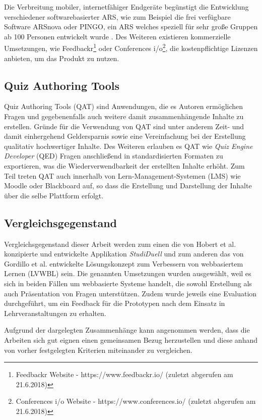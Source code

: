 \documentclass[conference]{IEEEtran}
\begin{document}
Die Verbreitung mobiler, internetfähiger Endgeräte begünstigt die Entwicklung verschiedener softwarebasierter ARS, wie zum Beispiel die frei verfügbare Software ARSnova \cite{Quibeldey-Cirkel2013} oder PINGO, ein ARS welches speziell für sehr große Gruppen ab 100 Personen entwickelt wurde \cite{Reinhardt2012}. Des Weiteren existieren kommerzielle Umsetzungen, wie Feedbackr\footnote[3]{Feedbackr Website - https://www.feedbackr.io/ (zuletzt abgerufen am 21.6.2018)} oder Conferences i/o\footnote[4]{Conferences i/o Website - https://www.conferences.io/ (zuletzt abgerufen am 21.6.2018)}, die kostenpflichtige Lizenzen anbieten, um das Produkt zu nutzen.

\subsection{Quiz Authoring Tools}
Quiz Authoring Tools (QAT) sind Anwendungen, die es Autoren ermöglichen Fragen und gegebenenfalls auch weitere damit zusammenhängende Inhalte zu erstellen. Gründe für die Verwendung von QAT sind unter anderem Zeit- und damit einhergehend Geldersparnis sowie eine Vereinfachung bei der Erstellung qualitativ hochwertiger Inhalte. Des Weiteren erlauben es QAT wie \emph{Quiz Engine Developer} (QED) Fragen anschließend in standardisierten Formaten zu exportieren, was die Wiederverwendbarkeit der erstellten Inhalte erhöht. Zum Teil treten QAT auch innerhalb von Lern-Management-Systemen (LMS) wie Moodle oder Blackboard auf, so dass die Erstellung und Darstellung der Inhalte über die selbe Plattform erfolgt. \cite[S. 2]{Gordillo2015} 

\subsection{Vergleichsgegenstand}
Vergleichsgegenstand dieser Arbeit werden zum einen die von Hobert et al. konzipierte und entwickelte Applikation \emph{StudiDuell}\cite{Hobert2017} und zum anderen das von Gordillo et al. entwickelte Lösungskonzept zum Verbessern von webbasiertem Lernen (LVWBL) \cite{Gordillo2015} sein. Die genannten Umsetzungen wurden ausgewählt, weil es sich in beiden Fällen um webbasierte Systeme handelt, die sowohl Erstellung als auch Präsentation von Fragen unterstützen. Zudem wurde jeweils eine Evaluation durchgeführt, um ein Feedback für die Prototypen nach dem Einsatz in Lehrveranstaltungen zu erhalten.
\cite{Hobert2017} \cite{Gordillo2015}

Aufgrund der dargelegten Zusammenhänge kann angenommen werden, dass die Arbeiten sich gut eignen einen gemeinsamen Bezug herzustellen und diese anhand von vorher festgelegten Kriterien miteinander zu vergleichen.
\end{document}
